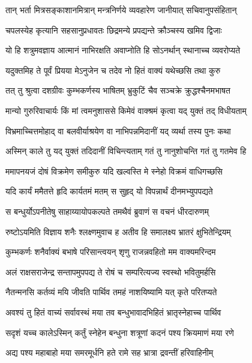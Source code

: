 \twolineshloka
{तान् भर्ता मित्रसङ्काशानमित्रान् मन्त्रनिर्णये}
{व्यवहारेण जानीयात् सचिवानुपसंहितान्} %

\twolineshloka
{चपलस्येह कृत्यानि सहसानुप्रधावतः}
{छिद्रमन्ये प्रपद्यन्ते क्रौञ्चस्य खमिव द्विजाः} %

\twolineshloka
{यो हि शत्रुमवज्ञाय आत्मानं नाभिरक्षति}
{अवाप्नोति हि सोऽनर्थान् स्थानाच्च व्यवरोप्यते} %

\twolineshloka
{यदुक्तमिह ते पूर्वं प्रियया मेऽनुजेन च}
{तदेव नो हितं वाक्यं यथेच्छसि तथा कुरु} %

\twolineshloka
{तत् तु श्रुत्वा दशग्रीवः कुम्भकर्णस्य भाषितम्}
{भ्रुकुटिं चैव सञ्चक्रे क्रुद्धश्चैनमभाषत} %

\twolineshloka
{मान्यो गुरुरिवाचार्यः किं मां त्वमनुशाससे}
{किमेवं वाक्श्रमं कृत्वा यद् युक्तं तद् विधीयताम्} %

\twolineshloka
{विभ्रमाच्चित्तमोहाद् वा बलवीर्याश्रयेण वा}
{नाभिपन्नमिदानीं यद् व्यर्था तस्य पुनः कथा} %

\twolineshloka
{अस्मिन् काले तु यद् युक्तं तदिदानीं विचिन्त्यताम्}
{गतं तु नानुशोचन्ति गतं तु गतमेव हि} %

\twolineshloka
{ममापनयजं दोषं विक्रमेण समीकुरु}
{यदि खल्वस्ति मे स्नेहो विक्रमं वाधिगच्छसि} %

\twolineshloka
{यदि कार्यं ममैतत्ते हृदि कार्यतमं मतम्}
{स सुहृद् यो विपन्नार्थं दीनमभ्युपपद्यते} %

\twolineshloka
{स बन्धुर्योऽपनीतेषु साहाय्यायोपकल्पते}
{तमथैवं ब्रुवाणं स वचनं धीरदारुणम्} %

\twolineshloka
{रुष्टोऽयमिति विज्ञाय शनैः श्लक्ष्णमुवाच ह}
{अतीव हि समालक्ष्य भ्रातरं क्षुभितेन्द्रियम्} %

\twolineshloka
{कुम्भकर्णः शनैर्वाक्यं बभाषे परिसान्त्वयन्}
{शृणु राजन्नवहितो मम वाक्यमरिन्दम} %

\twolineshloka
{अलं राक्षसराजेन्द्र सन्तापमुपपद्य ते}
{रोषं च सम्परित्यज्य स्वस्थो भवितुमर्हसि} %

\twolineshloka
{नैतन्मनसि कर्तव्यं मयि जीवति पार्थिव}
{तमहं नाशयिष्यामि यत् कृते परितप्यते} %

\twolineshloka
{अवश्यं तु हितं वाच्यं सर्वावस्थं मया तव}
{बन्धुभावादभिहितं भ्रातृस्नेहाच्च पार्थिव} %

\twolineshloka
{सदृशं यच्च कालेऽस्मिन् कर्तुं स्नेहेन बन्धुना}
{शत्रूणां कदनं पश्य क्रियमाणं मया रणे} %

\twolineshloka
{अद्य पश्य महाबाहो मया समरमूर्धनि}
{हते रामे सह भ्रात्रा द्रवन्तीं हरिवाहिनीम्} %


